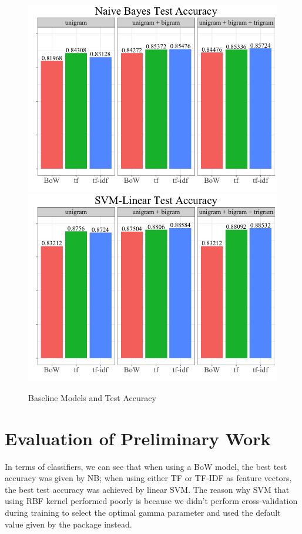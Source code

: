 \documentclass{article}
\begin{document}
\newpage
\begin{figure}[h!]
\includegraphics[scale=0.22]{nb.png}
\includegraphics[scale=0.22]{svm.png}
\caption{Baseline Models and Test Accuracy}
\label{fig:a}
\end{figure}


\section{Evaluation of Preliminary Work}

In terms of classifiers, we can see that when using a BoW model, the best test accuracy was given by NB; when using either TF or TF-IDF as feature vectors, the best test accuracy was achieved by linear SVM. The reason why SVM that using RBF kernel performed poorly is because we didn't perform cross-validation during training to select the optimal gamma parameter and used the default value given by the package instead.
\end{document}
